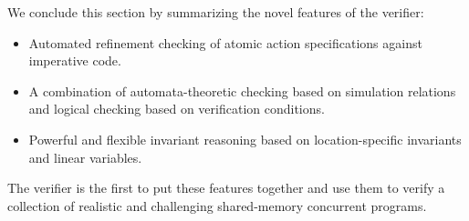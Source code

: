 We conclude this section by summarizing the novel features of the \civl verifier:
\begin{itemize}
\item Automated refinement checking of atomic action specifications against imperative code.
\item A combination of automata-theoretic checking based on simulation relations and logical checking based on verification conditions.
\item Powerful and flexible invariant reasoning based on location-specific invariants and linear variables.
\end{itemize}
The \civl verifier is the first to put these features together and use them to verify a collection of realistic and challenging shared-memory
concurrent programs.